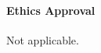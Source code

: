 \documentclass[9pt,twocolumn,twoside,lineno]{pnas-new}
\newcommand{\beginsupplement}{%
  \setcounter{table}{0}
  \renewcommand{\thetable}{S\arabic{table}}%
  \setcounter{figure}{0}
  \renewcommand{\thefigure}{S\arabic{figure}}%
}
\theoremstyle{case}
\numberwithin{subcase}{case}
\begin{document}
\paragraph{Ethics Approval}

Not applicable.




\newpage
\clearpage

\beginsupplement


\end{document}
